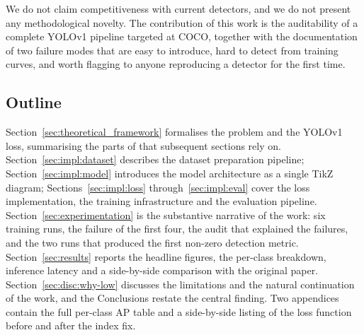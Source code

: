 We do not claim competitiveness with current detectors, and we do not
present any methodological novelty. The contribution of this work is the
auditability of a complete YOLOv1 pipeline targeted at COCO, together with
the documentation of two failure modes that are easy to introduce, hard to
detect from training curves, and worth flagging to anyone reproducing a
detector for the first time.

\subsection{Outline}
\label{sec:intro:outline}

Section~\ref{sec:theoretical_framework} formalises the problem and the
YOLOv1 loss, summarising the parts of \citet{redmon2016you} that subsequent
sections rely on. Section~\ref{sec:impl:dataset} describes the dataset
preparation pipeline; Section~\ref{sec:impl:model} introduces the model
architecture as a single TikZ diagram; Sections~\ref{sec:impl:loss}
through~\ref{sec:impl:eval} cover the loss implementation, the training
infrastructure and the evaluation pipeline. Section~\ref{sec:experimentation}
is the substantive narrative of the work: six training runs, the failure
of the first four, the audit that explained the failures, and the two
runs that produced the first non-zero detection metric. Section~\ref{sec:results}
reports the headline figures, the per-class breakdown, inference latency and
a side-by-side comparison with the original paper. Section~\ref{sec:disc:why-low}
discusses the limitations and the natural continuation of the work, and the
Conclusions restate the central finding. Two appendices contain the full
per-class AP table and a side-by-side listing of the loss function before
and after the index fix.
